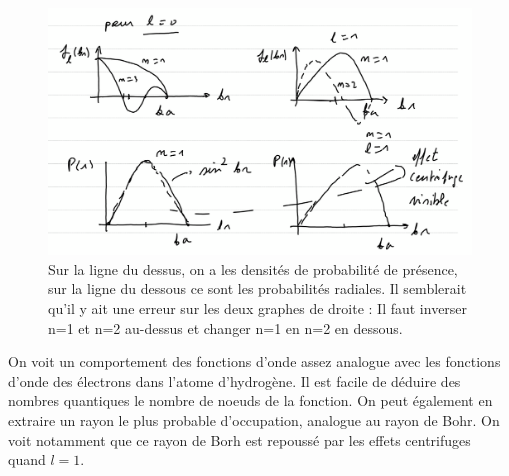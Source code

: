 \begin{figure}[H]
    \centering
    \includegraphics[scale = 0.6]{Images4/proba volumique.PNG}
    \caption{Sur la ligne du dessus, on a les densités de probabilité de présence, sur la ligne du dessous ce sont les probabilités radiales. Il semblerait qu'il y ait une erreur sur les deux graphes de droite : Il faut inverser n=1 et n=2 au-dessus et changer n=1 en n=2 en dessous.}
\end{figure}
On voit un comportement des fonctions d'onde assez analogue avec les fonctions d'onde des électrons dans l'atome d'hydrogène. Il est facile de déduire des nombres quantiques le nombre de noeuds de la fonction. On peut également en extraire un rayon le plus probable d'occupation, analogue au rayon de Bohr. On voit notamment que ce rayon de Borh est repoussé par les effets centrifuges quand $l = 1$.
